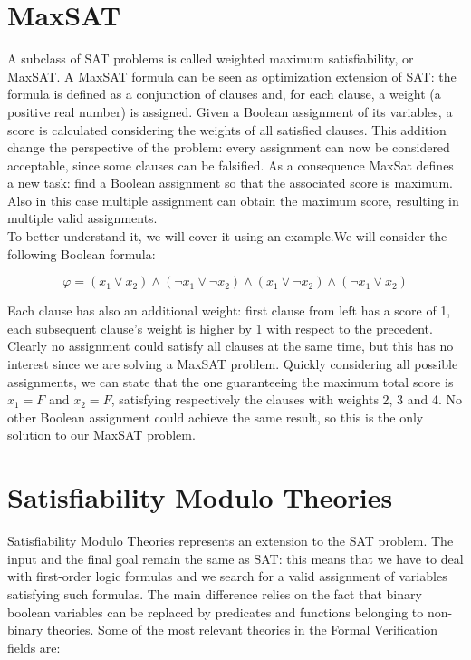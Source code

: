 \section{MaxSAT}
A subclass of SAT problems is called weighted maximum satisfiability, or MaxSAT. A MaxSAT formula can be seen as optimization extension of SAT: the formula is defined as a conjunction of clauses and, for each clause, a weight (a positive real number) is assigned. Given a Boolean assignment of its variables, a score is calculated considering the weights of all satisfied clauses. This addition change the perspective of the problem: every assignment can now be considered acceptable, since some clauses can be falsified. As a consequence MaxSat defines a new task: find a Boolean assignment so that the associated score is maximum. Also in this case multiple assignment can obtain the maximum score, resulting in multiple valid assignments. \\
To better understand it, we will cover it using an example.We will consider the following Boolean formula:

\begin{equation}
    \varphi = ( x_1 \vee x_2) \wedge (\neg x_1 \vee \neg x_2) \wedge ( x_1 \vee \neg x_2) \wedge (\neg x_1 \vee x_2)
\end{equation}

Each clause has also an additional weight: first clause from left has a score of 1, each subsequent clause's weight is higher by 1 with respect to the precedent. Clearly no assignment could satisfy all clauses at the same time, but this has no interest since we are solving a MaxSAT problem. Quickly considering all possible assignments, we can state that the one guaranteeing the maximum total score is $x_1 = F$ and $x_2 = F$, satisfying respectively the clauses with weights 2, 3 and 4. No other Boolean assignment could achieve the same result, so this is the only solution to our MaxSAT problem.

\section{Satisfiability Modulo Theories}

Satisfiability Modulo Theories represents an extension to the SAT problem. The input and the final goal remain the same as SAT: this means that we have to deal with first-order logic formulas and we search for a valid assignment of variables satisfying such formulas. The main difference relies on the fact that binary boolean variables can be replaced by predicates and functions belonging to non-binary theories. Some of the most relevant theories in the Formal Verification fields are:

